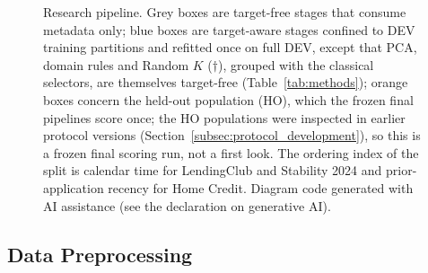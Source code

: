 \documentclass[final,5p,twocolumn]{elsarticle}
\newcommand{\Kfeat}{K}
\begin{document}
\begin{figure}[htbp]
\caption{Research pipeline. Grey boxes are target-free stages that consume metadata only; blue boxes are target-aware stages confined to DEV training partitions and refitted once on full DEV, except that PCA, domain rules and Random $\Kfeat$ ($\dagger$), grouped with the classical selectors, are themselves target-free (Table~\ref{tab:methods}); orange boxes concern the held-out population (HO), which the frozen final pipelines score once; the HO populations were inspected in earlier protocol versions (Section~\ref{subsec:protocol_development}), so this is a frozen final scoring run, not a first look. The ordering index of the split is calendar time for LendingClub and Stability 2024 and prior-application recency for Home Credit. Diagram code generated with AI assistance (see the declaration on generative AI).}
\label{fig:pipeline}
\end{figure}

\subsection{Data Preprocessing}
\label{subsec:preprocessing}
\end{document}
